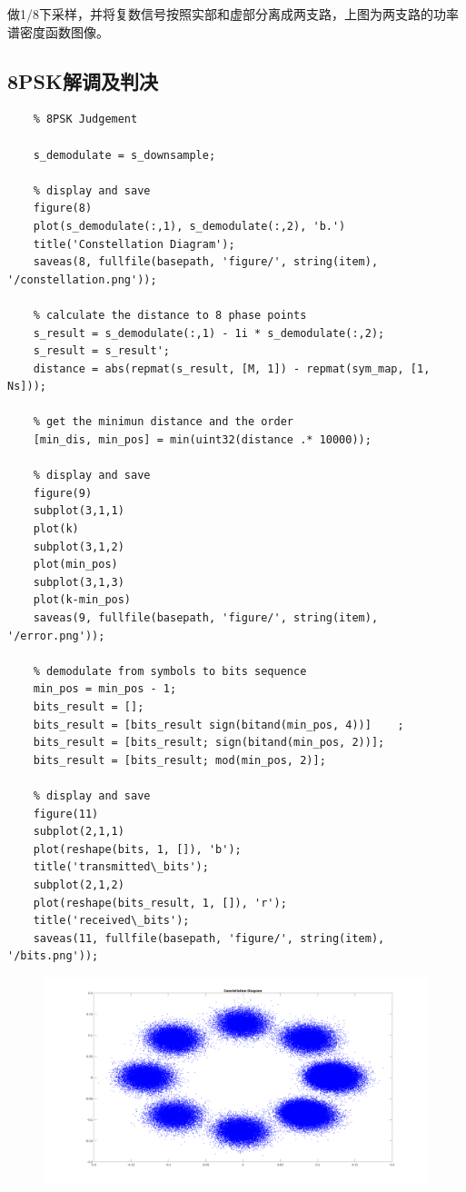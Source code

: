 \begin{spacing}{1.5}
做1/8下采样，并将复数信号按照实部和虚部分离成两支路，上图为两支路的功率谱密度函数图像。

\subsection{8PSK解调及判决}

\begin{lstlisting}
    % 8PSK Judgement

    s_demodulate = s_downsample;

    % display and save
    figure(8)
    plot(s_demodulate(:,1), s_demodulate(:,2), 'b.')
    title('Constellation Diagram');
    saveas(8, fullfile(basepath, 'figure/', string(item), '/constellation.png'));

    % calculate the distance to 8 phase points
    s_result = s_demodulate(:,1) - 1i * s_demodulate(:,2);
    s_result = s_result';
    distance = abs(repmat(s_result, [M, 1]) - repmat(sym_map, [1, Ns]));

    % get the minimun distance and the order
    [min_dis, min_pos] = min(uint32(distance .* 10000));

    % display and save
    figure(9)
    subplot(3,1,1)
    plot(k)
    subplot(3,1,2)
    plot(min_pos)
    subplot(3,1,3)
    plot(k-min_pos)
    saveas(9, fullfile(basepath, 'figure/', string(item), '/error.png'));

    % demodulate from symbols to bits sequence
    min_pos = min_pos - 1;
    bits_result = [];
    bits_result = [bits_result sign(bitand(min_pos, 4))]    ;
    bits_result = [bits_result; sign(bitand(min_pos, 2))];
    bits_result = [bits_result; mod(min_pos, 2)];

    % display and save
    figure(11)
    subplot(2,1,1)
    plot(reshape(bits, 1, []), 'b');
    title('transmitted\_bits');
    subplot(2,1,2)
    plot(reshape(bits_result, 1, []), 'r');
    title('received\_bits');
    saveas(11, fullfile(basepath, 'figure/', string(item), '/bits.png'));
\end{lstlisting}

\begin{figure}[H]
\centering
\includegraphics[width = \columnwidth]{constellation.png}
\end{figure}



\end{spacing}
